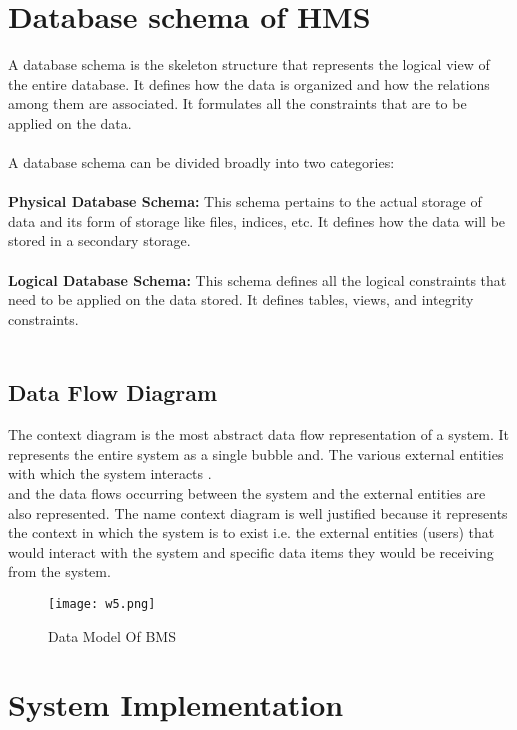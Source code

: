 \documentclass{article}
\begin{document}
\section{Database schema of HMS}
A database schema is the skeleton structure that represents the logical view of the entire database. It defines how the data is organized and how the relations among them are associated. It formulates all the constraints that are to be applied on the data.\\\\
A database schema can be divided broadly into two categories:\\\\
\textbf{Physical Database Schema:}  This schema pertains to the actual storage of data and its form of storage like files, indices, etc. It defines how the data will be stored in a secondary storage. \\\\
\textbf{Logical Database Schema:}  This schema defines all the logical constraints that need to be applied on the data stored. It defines tables, views, and integrity constraints. \\\\


\subsection{Data Flow Diagram }
The context diagram is the most abstract data flow representation of a system. It represents the entire system as a single bubble and. The various external entities with which the system interacts .\\
and the data flows occurring between the system and the external entities are also represented. The name context diagram is well justified because it represents the context in which the system is to exist i.e. the external entities (users) that would interact with the system and specific data items they would be receiving from the system. 
\begin{figure}[htp]
    \centering
    \texttt{[image: w5.png]}
    \caption{Data Model Of BMS }
    \label{fig:Data Model Diagram Of BMS  }
\end{figure}
\section{System Implementation}
\end{document}
